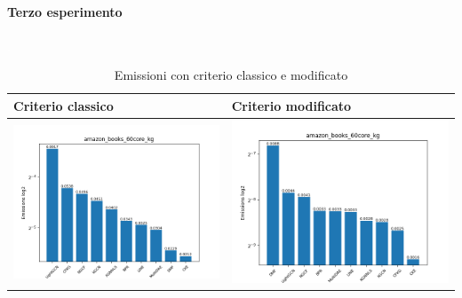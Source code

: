 \paragraph{Terzo esperimento} \textcolor{white}{.} \\
\begin{table}[H]
    \centering
    \footnotesize
    \setlength\tabcolsep{0pt}
    \begin{tabularx}{\textwidth}{|X|X|}
        \hline
        \textbf{Criterio classico} & \textbf{Criterio modificato} \\
        \hline
        \includegraphics[width=\linewidth, trim=0 0 0 0]{images/emissions_amazon_books_60core_kg_earlyClassic.png} &
        \includegraphics[width=\linewidth, trim=0 0 0 0]{images/emissions_amazon_books_60core_kg_earlyModified.png} \\
        \hline
    \end{tabularx}
    \caption{Emissioni con criterio classico e modificato}
    \label{tab:emissions_info}
\end{table}




